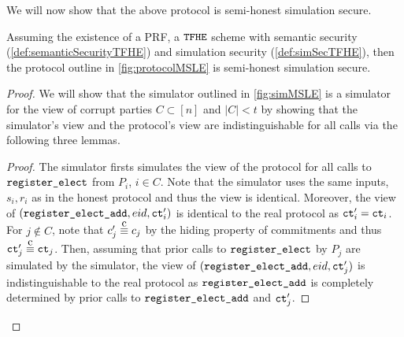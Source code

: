 \newcommand{\simCMSLE}{\texttt{Sim}_C}

We will now show that the above protocol is semi-honest simulation secure.

\begin{theorem}
	Assuming the existence of a PRF, a ${\texttt{TFHE}}$ scheme with semantic security (\cref{def:semanticSecurityTFHE}) and simulation security (\cref{def:simSecTFHE}),
	then the protocol outline in \cref{fig:protocolMSLE} is semi-honest simulation secure.
	\begin{proof}
		We will show that the simulator outlined in \cref{fig:simMSLE} is a simulator for the view of corrupt
		parties $C \subset [n]$ and $|C| < t$ by showing that the simulator's view and the protocol's view are indistinguishable for all calls
		via the following three lemmas.

		\begin{lemma}
			\begin{proof}
				The simulator firsts simulates the view of the protocol for all calls to $\texttt{register\_elect}$ from $P_i$, $i \in C$.
				Note that the simulator uses the same inputs, $s_i, r_i$ as in the honest protocol and thus the view is identical.
				Moreover, the view of $(\texttt{register\_elect\_add}, {eid}, \texttt{ct}'_i)$ is identical to the real protocol as $\texttt{ct}'_i = \texttt{ct}_i$.
				For $j \notin C$, note that $c'_j \compInd c_j$ by the hiding property of commitments and thus
				$\ct'_j \compInd \ct_j$.
				Then, assuming that prior calls to $\texttt{register\_elect}$ by $P_j$ are simulated by the simulator,
				the view of $(\texttt{register\_elect\_add}, {eid}, \texttt{ct}'_j)$ is indistinguishable to the real protocol as
				$\texttt{register\_elect\_add}$ is completely determined by prior calls to $\texttt{register\_elect\_add}$ and $\texttt{ct}'_j$.


\end{proof}
\end{lemma}
\end{proof}
\end{theorem}
